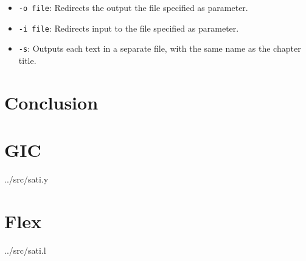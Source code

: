 \documentclass[a4paper]{report}
\begin{document}
\begin{itemize}
    \item \texttt{-o file}: Redirects the output the file specified as
        parameter.
    \item \texttt{-i file}: Redirects input to the file specified as parameter.
    \item \texttt{-s}: Outputs each text in a separate file, with the same name
        as the chapter title.
\end{itemize}

\chapter{Conclusion}

\appendix

\chapter{GIC}


{../src/sati.y}

\chapter{Flex}


{../src/sati.l}
\end{document}
